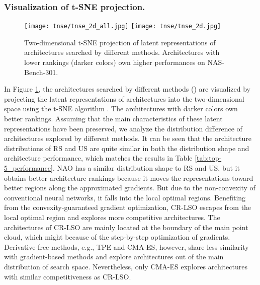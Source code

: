 \documentclass[10pt,twocolumn,letterpaper]{article}
\begin{document}
\subsubsection{Visualization of t-SNE projection.} \begin{figure}[htbp]
	\centering
	\texttt{[image: tnse/tnse\_2d\_all.jpg]}
	\texttt{[image: tnse/tnse\_2d.jpg]}
	\caption{Two-dimensional t-SNE projection of latent representations of architectures searched by different methods. Architectures with lower rankings (darker colors) own higher performances on NAS-Bench-301.}
	\label{fig:tnse_2d}
\end{figure}
In Figure \ref{fig:tnse_2d}, the architectures searched by different methods () are visualized by projecting the latent representations of architectures into the two-dimensional space using the t-SNE algorithm \cite{van2008visualizing}. The architectures with darker colors own better rankings. Assuming that the main characteristics of these latent representations have been preserved, we analyze the distribution difference of architectures explored by different methods. It can be seen that the architecture distributions of RS and US are quite similar in both the distribution shape and architecture performance, which matches the results in Table \ref{tab:top-5_performance}. NAO has a similar distribution shape to RS and US, but it obtains better architecture rankings because it moves the representations toward better regions along the approximated gradients. But due to the non-convexity of conventional neural networks, it falls into the local optimal regions. Benefiting from the convexity-guaranteed gradient optimization, CR-LSO escapes from the local optimal region and explores more competitive architectures. The architectures of CR-LSO are mainly located at the boundary of the main point cloud, which might because of the step-by-step optimization of gradients. Derivative-free methods, e.g., TPE and CMA-ES, however, share less similarity with gradient-based methods and explore architectures out of the main distribution of search space. Nevertheless, only CMA-ES explores architectures with similar competitiveness as CR-LSO.   
\end{document}

